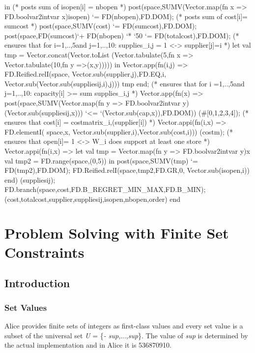 \documentclass[a4paper,halfparskip]{scrartcl}
\begin{document}
\begin{myverbatim}
    in  
      (* posts sum of isopen[i] = nbopen *) 
       post(space,SUMV(Vector.map(fn x => 
              FD.boolvar2intvar x)isopen) `= FD(nbopen),FD.DOM);
      (* posts sum of cost[i]= sumcost *)
       post(space,SUMV(cost) `= FD(sumcost),FD.DOM);
       post(space,FD(sumcost)`+ FD(nbopen) `* `50 
                    `= FD(totalcost),FD.DOM);
      (* ensures that for i={1,..,5}and j={1,..,10}: 
         supplies_{i,j} = 1 <-> supplier[j]=i *)
       let  
          val tmp = Vector.concat(Vector.toList
               (Vector.tabulate(5,fn x => 
                        Vector.tabulate(10,fn y =>(x,y)))))
       in
          Vector.app(fn(i,j) =>
               FD.Reified.relI(space,
                  Vector.sub(supplier,j),FD.EQ,i,
                  Vector.sub(Vector.sub(suppliesij,i),j)))
                    tmp
       end;
      (* ensures that for i ={1,..,5}and j={1,..,10}: 
         capacity[i] >= sum supplies_{i,j} *)
       Vector.app(fn(x) => 
          post(space,SUMV(Vector.map(fn y =>
                 FD.boolvar2intvar y)(Vector.sub(suppliesij,x))) 
                 `<= `(Vector.sub(cap,x)),FD.DOM))
                 (#[0,1,2,3,4]); 
      (* ensures that cost[i] = costmatrix_{i,(supplier[i])} *)           
       Vector.appi(fn(i,x) => FD.elementI( space,x,
                  Vector.sub(supplier,i),Vector.sub(cost,i)))
                  (costm);
      (* ensures that open[i]= 1 <-> 
         W_i does support at least one store *)   
       Vector.appi(fn(i,x) => 
         let
            val tmp = Vector.map(fn y => FD.boolvar2intvar y)x
            val tmp2 =  FD.range(space,(0,5))                  
         in
            post(space,SUMV(tmp) `= FD(tmp2),FD.DOM);
            FD.Reified.relI(space,tmp2,FD.GR,0, Vector.sub(isopen,i))
         end)  
           (suppliesij);
       FD.branch(space,cost,FD.B_REGRET_MIN_MAX,FD.B_MIN);
     ({cost,totalcost,supplier,suppliesij,isopen,nbopen},order)
   end

\end{myverbatim}




\newpage
\section{Problem Solving with Finite Set Constraints}
\subsection{Introduction}
\subsubsection{Set Values}
Alice provides finite sets of integers as 
first-class values and every set value is a subset of 
the universal set \emph{U} = \{\emph{- sup},$\ldots$,\emph{sup}\}. 
The value of \emph{sup} is determined by the 
actual implementation and in Alice it is 536870910.
\end{document}
